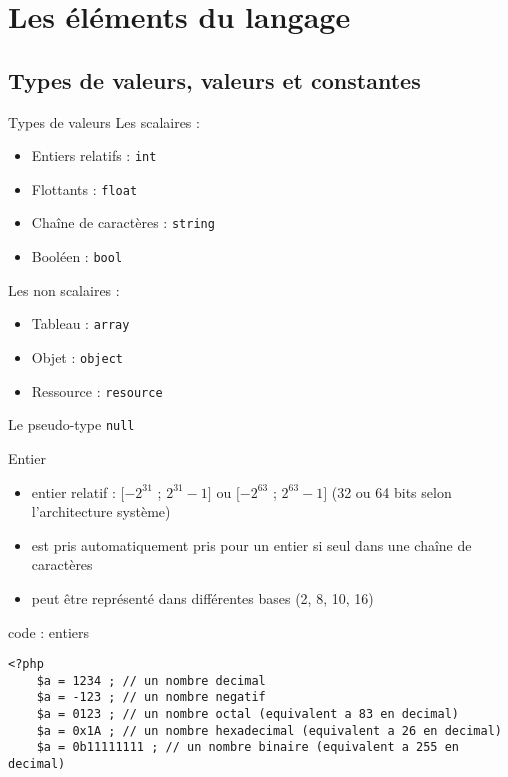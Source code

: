 
\section{Les éléments du langage}

\subsection{Types de valeurs, valeurs et constantes}

\begin{frame}{Types de valeurs}
	Les scalaires :
	\begin{itemize}
		\item Entiers relatifs : \texttt{int}
		\item Flottants : \texttt{float}
		\item Chaîne de caractères : \texttt{string}
		\item Booléen : \texttt{bool}
	\end{itemize}
	Les non scalaires :
	\begin{itemize}
		\item Tableau : \texttt{array}
		\item Objet : \texttt{object}
		\item Ressource : \texttt{resource}
	\end{itemize}
	Le pseudo-type \texttt{null}
\end{frame}

\begin{frame}[containsverbatim]{Entier}
	\begin{itemize}
		\item entier relatif : $[-2^{31}$ ; $2^{31} - 1]$ ou  $[-2^{63}$ ; $2^{63} - 1]$ (32 ou 64 bits selon l'architecture système)
		\item est pris automatiquement pris pour un entier si seul dans une chaîne de caractères
		\item peut être représenté dans différentes bases (2, 8, 10, 16) 
	\end{itemize}
	\begin{block}{code : entiers}
		\begin{lstlisting}
<?php
	$a = 1234 ; // un nombre decimal
	$a = -123 ; // un nombre negatif
	$a = 0123 ; // un nombre octal (equivalent a 83 en decimal)
	$a = 0x1A ; // un nombre hexadecimal (equivalent a 26 en decimal)
	$a = 0b11111111 ; // un nombre binaire (equivalent a 255 en decimal)
		\end{lstlisting}
	\end{block}
\end{frame}

